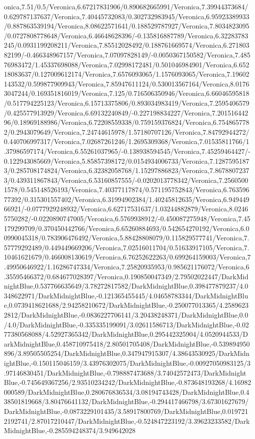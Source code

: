 {\begin{tikzternal}
onica,7.51/0.5/Veronica,6.67217831906/0.890682665991/Veronica,7.39944373684/0.629787137637/Veronica,7.40445732083/0.302732983945/Veronica,6.95923389933/0.887863539194/Veronica,8.08622571641/0.188529787927/Veronica,7.8034823095/0.0727808778648/Veronica,6.46648628396/-0.135816887789/Veronica,6.32283783245/0.0931199208211/Veronica,7.85512028492/0.188761669574/Veronica,6.27180382199/-0.466348967157/Veronica,7.07097828149/-0.0050367150582/Veronica,7.48576983472/1.45337698088/Veronica,7.02998172481/0.501046984901/Veronica,6.65218083637/0.127009612174/Veronica,7.6576093065/1.1576093065/Veronica,7.19602143532/0.599877909943/Veronica,7.85947611124/0.530013567164/Veronica,8.01763047244/0.169351816019/Veronica,7.125/0.716506350946/Veronica,6.66046595818/0.517794225123/Veronica,6.15713375806/0.893034983419/Veronica,7.2595406579/0.425577913929/Veronica,6.69132240849/-0.227198834227/Veronica,7.20151644296/0.18969188986/Veronica,6.72208559338/0.759159376824/Veronica,6.7548657782/0.2943079649/Veronica,7.24744615978/1.57180707126/Veronica,7.84792944272/0.440706997317/Veronica,7.02687261246/1.2695309368/Veronica,7.01535811766/1.37986597174/Veronica,6.55261037965/-0.138938594545/Veronica,7.45259464427/-0.122943085669/Veronica,5.85857398172/0.0154934006733/Veronica,7.12875951873/0.285708174824/Veronica,6.32382058768/1.15297886823/Veronica,7.86788072373/0.439311867843/Veronica,6.53160857555/-0.0202013778342/Veronica,7.25605001578/0.545148526193/Veronica,7.40377117874/0.571195752843/Veronica,6.76359677392/0.315301557402/Veronica,6.31994902384/1.40245812635/Veronica,6.94944966921/-0.0777929248932/Veronica,6.62717531637/1.03244882879/Veronica,8.02465750282/-0.0220890747005/Veronica,6.5769938912/-0.450087275948/Veronica,7.45179299709/0.370450442766/Veronica,6.65260884693/0.542654270192/Veronica,6.00990045318/0.783906476492/Veronica,5.88428808079/0.115829577741/Veronica,7.57779292489/0.449449669206/Veronica,7.02516011704/0.51633917105/Veronica,7.10461621679/0.466008130619/Veronica,6.76252622263/0.699264159003/Veronica,7.49950646922/1.16286747334/Veronica,7.25820935953/0.985621176072/Veronica,6.35595466372/0.684677028397/Veronica,0.190850047349/2.79502022447/DarkMidnightBlue,0.537766635649/3.78272817582/DarkMidnightBlue,0.398477879237/4.0348622971/DarkMidnightBlue,-0.121365455445/4.04658783344/DarkMidnightBlue,0.0739418621688/2.94258210672/DarkMidnightBlue,-0.250077013365/4.25896232812/DarkMidnightBlue,-0.0836227706141/3.20438248371/DarkMidnightBlue,0.0/4.0/DarkMidnightBlue,-0.335335199091/3.02611586713/DarkMidnightBlue,-0.0277380568088/4.52927365342/DarkMidnightBlue,0.295442325904/4.0520944533/DarkMidnightBlue,0.458710975418/2.80501705408/DarkMidnightBlue,-0.539894950896/3.89505505254/DarkMidnightBlue,0.347947915307/4.38643530925/DarkMidnightBlue,-0.150115046159/3.43976302075/DarkMidnightBlue,-0.00927050983125/3.97146830451/DarkMidnightBlue,-0.798887473688/3.74042572473/DarkMidnightBlue,-0.745649367256/2.93510234242/DarkMidnightBlue,-0.873648193268/4.16982000589/DarkMidnightBlue,0.280676836534/3.08194743428/DarkMidnightBlue,0.438501819668/3.80476641132/DarkMidnightBlue,-0.294417466798/3.67301627679/DarkMidnightBlue,-0.0873229101435/3.58917800769/DarkMidnightBlue,0.0197212192741/2.87017210447/DarkMidnightBlue,-0.524847223192/3.39623233582/DarkMidnightBlue,-0.285594248374/3.949642028
\end{tikzternal}}
